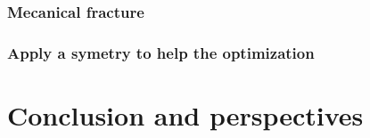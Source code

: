 \documentclass[pdftex, a4paper, 12pt]{report}
\begin{document}
            \subsection{Mecanical fracture}
            \subsection{Apply a symetry to help the optimization}
            
            \chapter{Conclusion and perspectives}                    
            
            

            
            
            
            
\end{document}
